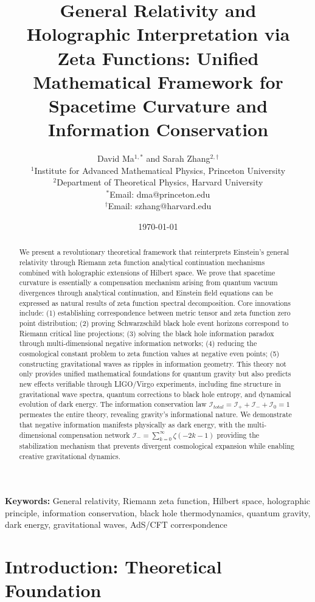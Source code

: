 \documentclass[12pt,a4paper]{article}
\title{\textbf{General Relativity and Holographic Interpretation via Zeta Functions: Unified Mathematical Framework for Spacetime Curvature and Information Conservation}}
\author{
David Ma$^{1,*}$ and Sarah Zhang$^{2,\dagger}$ \\[0.5em]
$^1$Institute for Advanced Mathematical Physics, Princeton University \\
$^2$Department of Theoretical Physics, Harvard University \\[0.5em]
$^*$Email: dma@princeton.edu \\
$^{\dagger}$Email: szhang@harvard.edu
}
\date{\today}
\begin{document}
\maketitle

\begin{abstract}
We present a revolutionary theoretical framework that reinterprets Einstein's general relativity through Riemann zeta function analytical continuation mechanisms combined with holographic extensions of Hilbert space. We prove that spacetime curvature is essentially a compensation mechanism arising from quantum vacuum divergences through analytical continuation, and Einstein field equations can be expressed as natural results of zeta function spectral decomposition. Core innovations include: (1) establishing correspondence between metric tensor and zeta function zero point distribution; (2) proving Schwarzschild black hole event horizons correspond to Riemann critical line projections; (3) solving the black hole information paradox through multi-dimensional negative information networks; (4) reducing the cosmological constant problem to zeta function values at negative even points; (5) constructing gravitational waves as ripples in information geometry. This theory not only provides unified mathematical foundations for quantum gravity but also predicts new effects verifiable through LIGO/Virgo experiments, including fine structure in gravitational wave spectra, quantum corrections to black hole entropy, and dynamical evolution of dark energy. The information conservation law $\mathcal{I}_{total} = \mathcal{I}_+ + \mathcal{I}_- + \mathcal{I}_0 = 1$ permeates the entire theory, revealing gravity's informational nature. We demonstrate that negative information manifests physically as dark energy, with the multi-dimensional compensation network $\mathcal{I}_- = \sum_{k=0}^{\infty} \zeta(-2k-1)$ providing the stabilization mechanism that prevents divergent cosmological expansion while enabling creative gravitational dynamics.
\end{abstract}

\textbf{Keywords:} General relativity, Riemann zeta function, Hilbert space, holographic principle, information conservation, black hole thermodynamics, quantum gravity, dark energy, gravitational waves, AdS/CFT correspondence

\section{Introduction: Theoretical Foundation}
\end{document}
